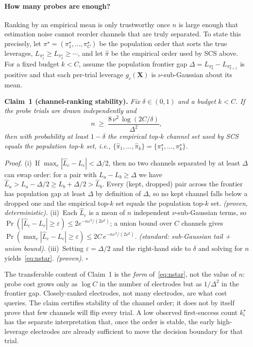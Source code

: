 \documentclass[journal]{IEEEtran}
\begin{document}
\paragraph{How many probes are enough?}
Ranking by an empirical mean is only trustworthy once $n$ is large enough that estimation noise cannot reorder channels that are truly separated. To state this precisely, let $\pi^\star=(\pi^\star_1,\ldots,\pi^\star_C)$ be the population order that sorts the true leverages, $L_{\pi^\star_1}\ge L_{\pi^\star_2}\ge\cdots$, and let $\widehat{\pi}$ be the empirical order used by SCS above. For a fixed budget $k<C$, assume the population frontier gap $\Delta=L_{\pi^\star_k}-L_{\pi^\star_{k+1}}$ is positive and that each per-trial leverage $g_c(\mathbf{X})$ is $\nu$-sub-Gaussian about its mean.

\medskip
\noindent\textbf{Claim~1 (channel-ranking stability).}
\emph{Fix $\delta\in(0,1)$ and a budget $k<C$. If the probe trials are drawn independently and
\begin{equation}
n\;\ge\;\frac{8\,\nu^2\,\log(2C/\delta)}{\Delta^2},
\label{eq:nstar}
\end{equation}
then with probability at least $1-\delta$ the empirical top-$k$ channel set used by SCS equals the population top-$k$ set, i.e., $\{\widehat{\pi}_1,\ldots,\widehat{\pi}_k\}=\{\pi^\star_1,\ldots,\pi^\star_k\}$.}

\medskip
\noindent\emph{Proof.}
(i)~If $\max_c|\widehat{L}_c-L_c|<\Delta/2$, then no two channels separated by at least $\Delta$ can swap order: for a pair with $L_a-L_b\ge\Delta$ we have $\widehat{L}_a>L_a-\Delta/2\ge L_b+\Delta/2>\widehat{L}_b$. Every (kept, dropped) pair across the frontier has population gap at least $\Delta$ by definition of $\Delta$, so no kept channel falls below a dropped one and the empirical top-$k$ set equals the population top-$k$ set. \emph{(proven, deterministic).}
(ii)~Each $\widehat{L}_c$ is a mean of $n$ independent $\nu$-sub-Gaussian terms, so $\Pr(|\widehat{L}_c-L_c|\ge\varepsilon)\le 2e^{-n\varepsilon^2/(2\nu^2)}$; a union bound over $C$ channels gives $\Pr(\max_c|\widehat{L}_c-L_c|\ge\varepsilon)\le 2C\,e^{-n\varepsilon^2/(2\nu^2)}$. \emph{(standard: sub-Gaussian tail + union bound).}
(iii)~Setting $\varepsilon=\Delta/2$ and the right-hand side to $\delta$ and solving for $n$ yields~\eqref{eq:nstar}. \emph{(proven).} \hfill$\square$

\medskip
The transferable content of Claim~1 is the \emph{form} of~\eqref{eq:nstar}, not the value of $n$: probe cost grows only as $\log C$ in the number of electrodes but as $1/\Delta^2$ in the frontier gap. Closely-ranked electrodes, not many electrodes, are what cost queries. The claim certifies stability of the channel order; it does not by itself prove that few channels will flip every trial. A low observed first-success count $k_i^\star$ has the separate interpretation that, once the order is stable, the early high-leverage electrodes are already sufficient to move the decision boundary for that trial.
\end{document}
